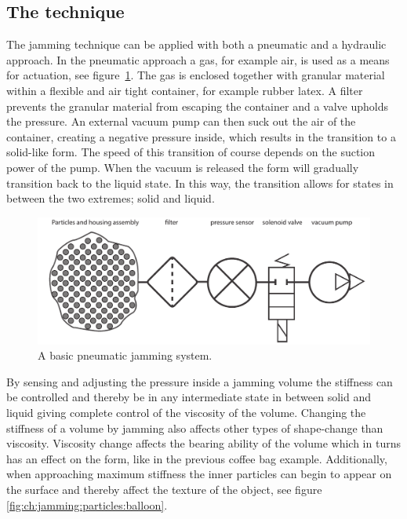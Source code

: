 \subsection{The technique}
\label{ch:jamming:technique}

The jamming technique can be applied with both a pneumatic and a hydraulic approach.
In the pneumatic approach a gas, for example air, is used as a means for actuation, see figure~\ref{fig:ch:jamming:jamming-basics}.
The gas is enclosed together with granular material within a flexible and air tight container, for example rubber latex. 
A filter prevents the granular material from escaping the container and a valve upholds the pressure.
An external vacuum pump can then suck out the air of the container, creating a negative pressure inside, which results in the transition to a solid-like form. 
The speed of this transition of course depends on the suction power of the pump.
When the vacuum is released the form will gradually transition back to the liquid state. 
In this way, the transition allows for states in between the two extremes; solid and liquid.

\begin{figure}[h]
  \centering
  \includegraphics[width=.9\textwidth]{figures/jamming/jamming-basics.pdf}
  \caption{A basic pneumatic jamming system.}
  \label{fig:ch:jamming:jamming-basics}
\end{figure}

By sensing and adjusting the pressure inside a jamming volume the stiffness can be controlled and thereby be in any intermediate state in between solid and liquid giving complete control of the viscosity of the volume.
Changing the stiffness of a volume by jamming also affects other types of shape-change than viscosity.
Viscosity change affects the bearing ability of the volume which in turns has an effect on the form, like in the previous coffee bag example.
Additionally, when approaching maximum stiffness the inner particles can begin to appear on the surface and thereby affect the texture of the object, see figure \ref{fig:ch:jamming:particles:balloon}.

